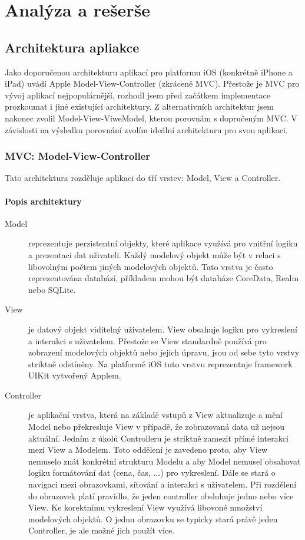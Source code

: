 \chapter{Analýza a rešerše}\label{analyza}

\section{Architektura apliakce}\label{analyza-architektura}

Jako doporučenou architekturu aplikací pro platformu iOS (konkrétně iPhone a iPad) uvádí Apple Model-View-Controller (zkráceně MVC).
Přestože je MVC pro vývoj aplikací nejpopulárnější, rozhodl jsem před začátkem implementace prozkoumat i jiné existující architektury.
Z alternativních architektur jsem nakonec zvolil Model-View-ViweModel, kterou porovnám s dopručeným MVC.
V závislosti na výsledku porovnání zvolím ideální architekturu pro svou aplikaci.

\subsection{MVC: Model-View-Controller}\label{analyza-mvc}
Tato architektura rozděluje aplikaci do tří vrstev: Model, View a Controller.

\subsubsection{Popis architektury}

\begin{description}
  \item[Model] reprezentuje perzistentní objekty, které aplikace využívá pro vnitřní logiku a prezentaci dat uživateli.
  Každý modelový objekt může být v relaci s libovolným počtem jiných modelových objektů.
  Tato vrstva je často reprezentována databází, příkladem mohou být databáze CoreData, Realm nebo SQLite.

  \item[View] je datový objekt viditelný uživatelem. View obsahuje logiku pro vykreslení a interakci s uživatelem.
  Přestože se View standardně používá pro zobrazení modelových objektů nebo jejich úpravu, jsou od sebe tyto vrstvy striktně odstíněny.
  Na platformě iOS tuto vrstvu reprezentuje framework UIKit vytvořený Applem.

  \item[Controller] je aplikační vrstva, která na základě vstupů z View aktualizuje a mění Model nebo překresluje View v případě, že zobrazovaná data už nejsou aktuální.
  Jedním z úkolů Controlleru je striktně zamezit přímé interakci mezi View a Modelem.
  Toto oddělení je zavedeno proto, aby View nemuselo znát konkrétní strukturu Modelu a aby Model nemusel obsahovat logiku formátování dat (cena, čas, ...) pro vykreslení.
  Dále se stará o navigaci mezi obrazovkami, síťování a interakci s uživatelem.
  Při rozdělení do obrazovek platí pravidlo, že jeden controller obsluhuje jedno nebo více View.
  Ke korektnímu vykreslení View využívá libovoné množství modelových objektů.
  O jednu obrazovku se typicky stará právě jeden Controller, je ale možné jich použít více.
\end{description}

